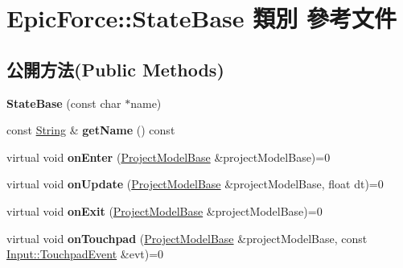 \hypertarget{class_epic_force_1_1_state_base}{}\section{Epic\+Force\+:\+:State\+Base 類別 參考文件}
\label{class_epic_force_1_1_state_base}
\subsection*{公開方法(Public Methods)}
\begin{DoxyCompactItemize}
\item 
{\bfseries State\+Base} (const char $\ast$name)\hypertarget{class_epic_force_1_1_state_base_a10e4112288f8bf63d19225997e64c5b2}{}\label{class_epic_force_1_1_state_base_a10e4112288f8bf63d19225997e64c5b2}

\item 
const \hyperlink{class_i_dream_sky_1_1_string}{String} \& {\bfseries get\+Name} () const \hypertarget{class_epic_force_1_1_state_base_a80956eec81f213ae99415ace1bc703db}{}\label{class_epic_force_1_1_state_base_a80956eec81f213ae99415ace1bc703db}

\item 
virtual void {\bfseries on\+Enter} (\hyperlink{class_epic_force_1_1_project_model_base}{Project\+Model\+Base} \&project\+Model\+Base)=0\hypertarget{class_epic_force_1_1_state_base_a538089f451125ed57129112232cb47b4}{}\label{class_epic_force_1_1_state_base_a538089f451125ed57129112232cb47b4}

\item 
virtual void {\bfseries on\+Update} (\hyperlink{class_epic_force_1_1_project_model_base}{Project\+Model\+Base} \&project\+Model\+Base, float dt)=0\hypertarget{class_epic_force_1_1_state_base_a422beeeea6409e340529a7dadbaa45dc}{}\label{class_epic_force_1_1_state_base_a422beeeea6409e340529a7dadbaa45dc}

\item 
virtual void {\bfseries on\+Exit} (\hyperlink{class_epic_force_1_1_project_model_base}{Project\+Model\+Base} \&project\+Model\+Base)=0\hypertarget{class_epic_force_1_1_state_base_a6288ddf4f1f3e31c5f6c13e689a6f981}{}\label{class_epic_force_1_1_state_base_a6288ddf4f1f3e31c5f6c13e689a6f981}

\item 
virtual void {\bfseries on\+Touchpad} (\hyperlink{class_epic_force_1_1_project_model_base}{Project\+Model\+Base} \&project\+Model\+Base, const \hyperlink{class_i_dream_sky_1_1_input_1_1_touchpad_event}{Input\+::\+Touchpad\+Event} \&evt)=0\hypertarget{class_epic_force_1_1_state_base_acef46b7376d7d249c3e4fffe0a2f0a31}{}\label{class_epic_force_1_1_state_base_acef46b7376d7d249c3e4fffe0a2f0a31}


\end{DoxyCompactItemize}
